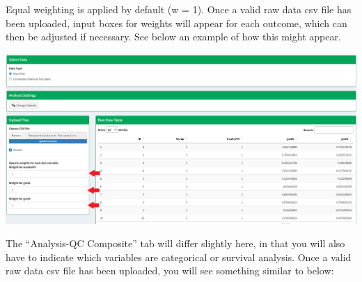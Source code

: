 \documentclass[
]{article}
\begin{document}
Equal weighting is applied by default (w = 1). Once a valid raw data csv
file has been uploaded, input boxes for weights will appear for each
outcome, which can then be adjusted if necessary. See below an example
of how this might appear.

\begin{center}\includegraphics[width=22.89in]{SC-QC_Tutorial_Raw_Data_selection} \end{center}

The ``Analysis-QC Composite'' tab will differ slightly here, in that you
will also have to indicate which variables are categorical or survival
analysis. Once a valid raw data csv file has been uploaded, you will see
something similar to below:
\end{document}
